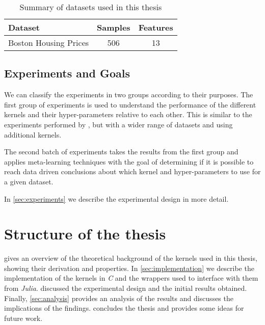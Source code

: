 \begin{table}[H]
    \caption{Summary of datasets used in this thesis}
    \label{tab:datasets}
    \begin{tabular}{lcc}
        \toprule
        Dataset & Samples & Features \\
        \midrule
        Boston Housing Prices & 506 & 13 \\
        \bottomrule
    \end{tabular}
\end{table}

\subsection{Experiments and Goals}%

We can classify the experiments in two groups according to their purposes.
The first group of experiments is used to understand the performance of the
different kernels and their hyper-parameters relative to each other. This
is similar to the experiments performed by \textcite{frenayParameterinsensitiveKernelExtreme2011},
but with a wider range of datasets and using additional kernels.

The second batch of experiments takes the results from the first group and
applies meta-learning techniques with the goal of determining if it is possible
to reach data driven conclusions about which kernel and hyper-parameters to use
for a given dataset.

In \cref{sec:experiments} we describe the experimental design in more detail.



\section{Structure of the thesis}

 gives an overview of the theoretical background
of the kernels used in this thesis, showing their derivation and properties. In
\cref{sec:implementation} we describe the implementation of the kernels in \emph{C}
and the wrappers used to interface with them from \emph{Julia}. 
discussed the experimental design and the initial results obtained. Finally,
\cref{sec:analysis} provides an analysis of the results and discusses the
implications of the findings.  concludes the thesis and
provides some ideas for future work.

